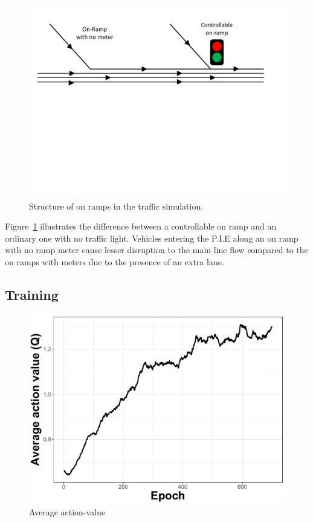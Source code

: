 \documentclass{sig-alternate-05-2015}
\begin{document}
   \begin{figure}[!htbp]
         \centering
         \includegraphics[clip=true,trim=0.3cm 11cm 1cm 0.0cm,scale=0.35]{images/Ramps.pdf}
     
         \caption{Structure of on ramps in the traffic simulation.}
         \label{fig:ramp-struc}
     \end{figure}
 
 Figure~\ref{fig:ramp-struc} illustrates the difference between a controllable on ramp and an ordinary one with no traffic light. Vehicles entering the P.I.E along an on ramp with no ramp meter cause lesser disruption to the main line flow compared to the on ramps with meters due to the presence of an extra lane.
 



\subsection{Training}
\label{subsec:training}

\begin{figure}[!htbp]
    \centering
    \includegraphics[scale=0.35]{images/Qvalue.pdf}

    \caption{Average action-value}
    \label{fig:q-value}
\end{figure}
\end{document}
